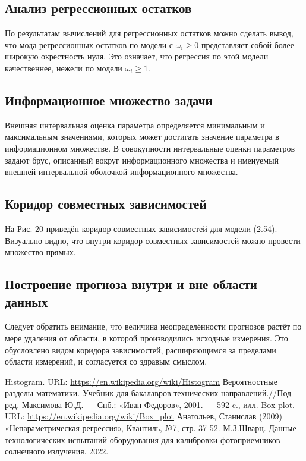 \documentclass[a4paper,14pt]{article}
\begin{document}
	\subsection{Анализ регрессионных остатков}
	По результатам вычислений для регрессионных остатков можно сделать вывод, что мода регрессионных остатков по модели с $\omega_i \geq 0$ представляет собой более широкую окрестность нуля. Это означает, что регрессия по этой модели качественнее, нежели по модели $\omega_i \geq 1$.
	
	\subsection{Информационное множество задачи}
	Внешняя интервальная оценка параметра определяется минимальным и максимальным значениями, которых может достигать значение параметра в информационном множестве.
	В совокупности интервальные оценки параметров задают брус, описанный вокруг информационного множества и именуемый внешней интервальной оболочкой информационного
	множества.
	
	\subsection{Коридор совместных зависимостей}
	На Рис. 20 приведён коридор совместных зависимостей для модели (2.54). Визуально видно, что внутри коридор совместных зависимостей можно провести множество прямых.
	
	\subsection{Построение прогноза внутри и вне области данных}
	Следует обратить внимание, что величина неопределённости прогнозов растёт по мере удаления от области, в которой производились исходные измерения. Это обусловлено видом коридора зависимостей, расширяющимся за пределами области измерений, и согласуется со здравым смыслом.
	
	\newpage
	
	\begin{thebibliography}{4}
		Histogram. URL: \url{https://en.wikipedia.org/wiki/Histogram}
		Вероятностные разделы математики. Учебник для бакалавров технических направлений.//Под ред. Максимова Ю.Д. --- Спб.: «Иван Федоров», 2001. --- 592 c., илл.
		Box plot. URL: \url{https://en.wikipedia.org/wiki/Box_plot}
		Анатольев, Станислав (2009) «Непараметрическая регрессия», Квантиль, №7, стр. 37-52.
		 М.З.Шварц. Данные технологических испытаний оборудования для калибровки фотоприемников солнечного излучения. 2022.
	\end{thebibliography}
\end{document}
